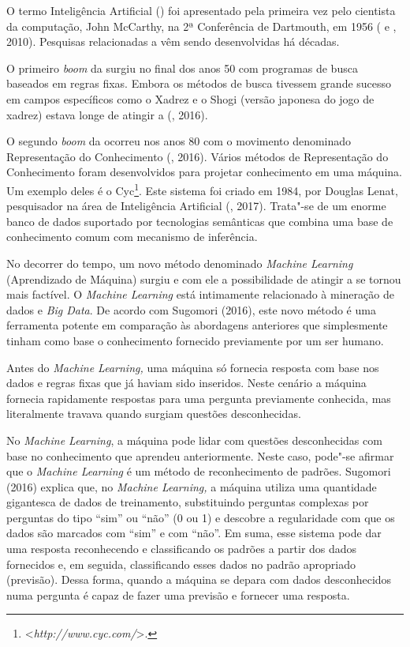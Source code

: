 O termo Inteligência Artificial () foi apresentado pela primeira vez
pelo cientista da computação, John McCarthy, na 2ª Conferência de
Dartmouth, em 1956 ( e , 2010). Pesquisas relacionadas a 
vêm sendo desenvolvidas há décadas.

O primeiro \emph{boom} da  surgiu no final dos anos 50 com programas
de busca baseados em regras fixas. Embora os métodos de busca tivessem
grande sucesso em campos específicos como o Xadrez e o Shogi (versão
japonesa do jogo de xadrez) estava longe de atingir a  (,
2016).

O segundo \emph{boom} da  ocorreu nos anos 80 com o movimento
denominado Representação do Conhecimento (, 2016). Vários
métodos de Representação do Conhecimento foram desenvolvidos para
projetar conhecimento em uma máquina. Um exemplo deles é o Cyc\footnote{\textless{}\emph{http://www.cyc.com/}\textgreater{}.}.
Este sistema foi criado em 1984, por Douglas Lenat, pesquisador na área
de Inteligência Artificial (, 2017). Trata"-se de um enorme banco
de dados suportado por tecnologias semânticas que combina uma base de
conhecimento comum com mecanismo de inferência.

No decorrer do tempo, um novo método denominado \emph{Machine Learning}
(Aprendizado de Máquina) surgiu e com ele a possibilidade de atingir a
 se tornou mais factível. O \emph{Machine Learning} está intimamente
relacionado à mineração de dados e \emph{Big Data}. De acordo com
Sugomori (2016), este novo método é uma ferramenta potente em comparação
às abordagens anteriores que simplesmente tinham como base o
conhecimento fornecido previamente por um ser humano.

Antes do \emph{Machine Learning,} uma máquina só fornecia resposta com
base nos dados e regras fixas que já haviam sido inseridos. Neste
cenário a máquina fornecia rapidamente respostas para uma pergunta
previamente conhecida, mas literalmente travava quando surgiam questões
desconhecidas.

No \emph{Machine Learning}, a máquina pode lidar com questões
desconhecidas com base no conhecimento que aprendeu anteriormente. Neste
caso, pode"-se afirmar que o \emph{Machine Learning} é um método de
reconhecimento de padrões. Sugomori (2016) explica que, no \emph{Machine
Learning,} a máquina utiliza uma quantidade gigantesca de dados de
treinamento, substituindo perguntas complexas por perguntas do tipo
``sim'' ou ``não'' (0 ou 1) e descobre a regularidade com que os dados
são marcados com ``sim'' e com ``não''. Em suma, esse sistema pode dar
uma resposta reconhecendo e classificando os padrões a partir dos dados
fornecidos e, em seguida, classificando esses dados no padrão apropriado
(previsão). Dessa forma, quando a máquina se depara com dados
desconhecidos numa pergunta é capaz de fazer uma previsão e fornecer uma
resposta.

